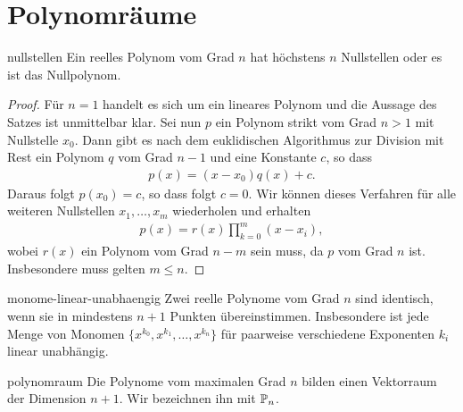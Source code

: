 \section{Polynomräume}

\begin{Satz}{nullstellen}
  Ein reelles Polynom vom Grad $n$ hat höchstens $n$ Nullstellen oder es ist das Nullpolynom.
\end{Satz}

\begin{proof}
  Für $n=1$ handelt es sich um ein lineares Polynom und die Aussage
  des Satzes ist unmittelbar klar. Sei nun $p$ ein Polynom strikt vom
  Grad $n>1$ mit Nullstelle $x_0$. Dann gibt es nach dem euklidischen
  Algorithmus zur Division mit Rest ein Polynom $q$ vom Grad $n-1$ und
  eine Konstante $c$, so dass
  \begin{gather}
    p(x) = (x-x_0)q(x)+c.
  \end{gather}
  Daraus folgt $p(x_0) = c$, so dass folgt $c=0$. Wir können dieses
  Verfahren für alle weiteren Nullstellen $x_1,\dots,x_m$ wiederholen
  und erhalten
  \begin{gather}
    p(x) =  r(x) \prod_{k=0}^m (x-x_i),
  \end{gather}
  wobei $r(x)$ ein Polynom vom Grad $n-m$ sein muss, da $p$ vom Grad
  $n$ ist. Insbesondere muss gelten $m\le n$.
\end{proof}

\begin{Korollar}{monome-linear-unabhaengig}
  Zwei reelle Polynome vom Grad $n$ sind identisch, wenn sie in
  mindestens $n+1$ Punkten übereinstimmen. Insbesondere ist jede Menge
  von Monomen $\{x^{k_0}, x^{k_1},\dots,x^{k_n}\}$ für paarweise
  verschiedene Exponenten $k_i$ linear unabhängig.
\end{Korollar}

\begin{Satz}{polynomraum}
  Die Polynome vom maximalen Grad $n$ bilden einen Vektorraum der
  Dimension $n+1$.  Wir bezeichnen ihn mit $\P_n$.
\end{Satz}

